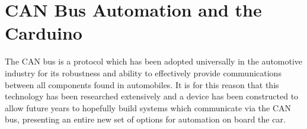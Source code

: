 %


\section{CAN Bus Automation and the Carduino}
The CAN bus is a protocol which has been adopted universally in the automotive industry for its robustness and ability to effectively provide communications between all components found in automobiles. It is for this reason that this technology has been researched extensively and a device has been constructed to allow future years to hopefully build systems which communicate via the CAN bus, presenting an entire new set of options for automation on board the car.

